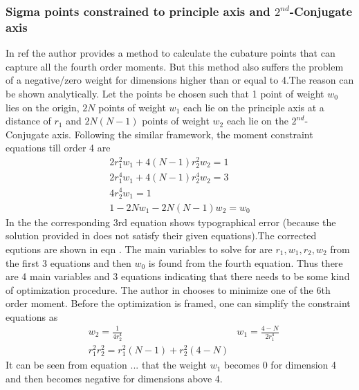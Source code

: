 \documentclass[letterpaper, 10 pt, conference]{ieeeconf}  %
\begin{document}
\subsubsection{Sigma points constrained to principle axis and $2^{nd}$-Conjugate axis}
In ref \cite{c1} the author provides a method to calculate the cubature points that can capture all the fourth order moments. But this method also suffers the problem of a negative/zero weight for dimensions higher than or equal to 4.The reason can be shown analytically. Let the points be chosen such that 1 point of weight $w_0$ lies on the origin, $2N$ points of weight $w_1$ each lie on the principle axis at a distance of $r_1$  and $2N(N-1)$ points of weight $w_2$ each lie on the $2^{nd}$- Conjugate axis. Following the similar framework, the moment constraint equations till order 4 are
\setlength{\arraycolsep}{0.0em}
\begin{eqnarray}
2r_1^2w_1+4(N-1)r_2^2w_2=1\\
2r_1^4w_1+4(N-1)r_2^4w_2=3\\
4r_2^4w_1=1\\
1-2Nw_1-2N(N-1)w_2=w_0
\end{eqnarray}
\setlength{\arraycolsep}{5pt}  
In the \cite{c1} the corresponding 3rd equation shows typographical error (because the solution provided in \cite{c1} does not satisfy their given equations).The corrected equtions are shown in eqn . The main variables to solve for are $r_1,w_1,r_2,w_2$ from the first 3 equations and then $w_0$ is found from the fourth equation. Thus there are 4 main variables and 3 equations indicating that there needs to be some kind of optimization procedure. The author in \cite{c1} chooses to minimize one of the 6th order moment. Before the optimization is framed, one can simplify the constraint equations as
\setlength{\arraycolsep}{0.0em}
\begin{eqnarray}
&w_2=\frac{1}{4r_2^4} \quad &w_1=\frac{4-N}{2r_1^4}\\
&r_1^2r_2^2=r_1^2(N-1)+r_2^2(4-N)
\end{eqnarray}
\setlength{\arraycolsep}{5pt}    
It can be seen from equation ... that the weight $w_1$ becomes 0 for dimension 4 and then becomes negative for dimensions above 4. 
\end{document}
